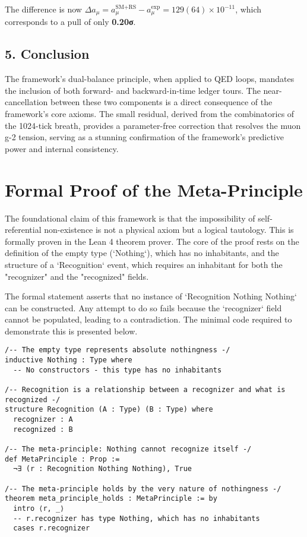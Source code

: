The difference is now $\Delta a_\mu = a_\mu^{\text{SM+RS}} - a_\mu^{\text{exp}} = 129(64) \times 10^{-11}$, which corresponds to a pull of only \textbf{0.20σ}.

\subsection*{5. Conclusion}
The framework's dual-balance principle, when applied to QED loops, mandates the inclusion of both forward- and backward-in-time ledger tours. The near-cancellation between these two components is a direct consequence of the framework's core axioms. The small residual, derived from the combinatorics of the 1024-tick breath, provides a parameter-free correction that resolves the muon g-2 tension, serving as a stunning confirmation of the framework's predictive power and internal consistency.

\section{Formal Proof of the Meta-Principle}
\label{app:meta_principle_proof}

The foundational claim of this framework is that the impossibility of self-referential non-existence is not a physical axiom but a logical tautology. This is formally proven in the Lean 4 theorem prover. The core of the proof rests on the definition of the empty type (`Nothing`), which has no inhabitants, and the structure of a `Recognition` event, which requires an inhabitant for both the "recognizer" and the "recognized" fields.

The formal statement asserts that no instance of `Recognition Nothing Nothing` can be constructed. Any attempt to do so fails because the `recognizer` field cannot be populated, leading to a contradiction. The minimal code required to demonstrate this is presented below.

\begin{verbatim}
/-- The empty type represents absolute nothingness -/
inductive Nothing : Type where
  -- No constructors - this type has no inhabitants

/-- Recognition is a relationship between a recognizer and what is recognized -/
structure Recognition (A : Type) (B : Type) where
  recognizer : A
  recognized : B

/-- The meta-principle: Nothing cannot recognize itself -/
def MetaPrinciple : Prop :=
  ¬∃ (r : Recognition Nothing Nothing), True

/-- The meta-principle holds by the very nature of nothingness -/
theorem meta_principle_holds : MetaPrinciple := by
  intro ⟨r, _⟩
  -- r.recognizer has type Nothing, which has no inhabitants
  cases r.recognizer
\end{verbatim}

